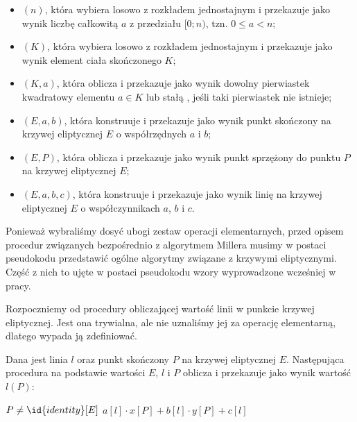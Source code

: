 \begin{remark}
\begin{itemize}
\begin{itemize}
\item {}$(n)$, 
która wybiera losowo z rozkładem jednostajnym i przekazuje jako wynik
liczbę całkowitą $a$ z przedziału $[0; n)$, tzn. $0 \leq a < n$;
\item {}$(K)$,
która wybiera losowo z rozkładem jednostajnym i przekazuje jako wynik
element ciała skończonego $K$;
\item {}$(K, a)$,
która oblicza i przekazuje jako \linebreak wynik
dowolny pierwiastek kwadratowy elementu $a \in K$
lub stałą , jeśli taki pierwiastek nie istnieje;
\item {}$(E, a, b)$,
która konstruuje i przekazuje jako wynik
punkt skończony na krzywej eliptycznej $E$ o współrzędnych $a$ i $b$;
\item {}$(E, P)$,
która oblicza i przekazuje jako wynik
punkt sprzężony do punktu $P$ na krzywej eliptycznej $E$;
\item {}$(E, a, b, c)$,
która konstruuje i przekazuje jako wynik
linię na krzywej eliptycznej $E$ o współczynnikach $a$, $b$ i $c$.
\end{itemize}
\end{itemize}
\end{remark}

\noindent
Ponieważ wybraliśmy dosyć ubogi zestaw operacji elementarnych,
przed opisem procedur związanych bezpośrednio z algorytmem Millera
musimy w postaci pseudokodu przedstawić
ogólne algorytmy związane z krzywymi eliptycznymi.
Część z nich to ujęte w postaci pseudokodu
wzory wyprowadzone wcześniej w pracy.

\noindent
Rozpoczniemy od procedury obliczającej
wartość linii w punkcie krzywej eliptycznej.
Jest ona trywialna, ale nie uznaliśmy jej za operację elementarną,
dlatego wypada ją zdefiniować.

\begin{algorithm}
Dana jest linia $l$ oraz punkt skończony $P$ na krzywej eliptycznej $E$.
Następująca procedura
na podstawie wartości $E$, $l$ i $P$
oblicza i przekazuje jako wynik
wartość $l(P)$:

\begin{codebox}
\li \Assert $P \neq \id{identity}[E]$
\li \Return $a[l]\cdot x[P] + b[l]\cdot y[P] + c[l]$
\end{codebox}
\end{algorithm}

